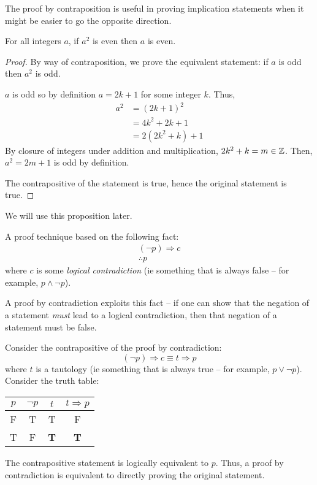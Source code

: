 \documentclass[main.tex]{subfiles}
\begin{document}
The proof by contraposition is useful in proving implication statements when it might be easier to go the opposite direction.

\begin{prop}\label{prop3.x:eucl-arg-lemma}
	For all integers \(a\), if \(a^2\) is even then \(a\) is even.
\end{prop}

\begin{proof}
	By way of contraposition, we prove the equivalent statement: if \(a\) is odd then \(a^2\) is odd.
	
	\(a\) is odd so by definition \(a = 2k+1\) for some integer \(k\). Thus,
	\begin{align*}
	a^2 &= (2k+1)^2 \\ &= 4k^2 + 2k + 1 \\ &= 2(2k^2 + k) + 1
	\end{align*}
	By closure of integers under addition and multiplication, \(2k^2 + k = m \in \mathbb{Z}\). Then, \(a^2 = 2m+1\) is odd by definition.
	
	The contrapositive of the statement is true, hence the original statement is true.
\end{proof}

We will use this proposition later. %


\begin{defn}
	A proof technique based on the following fact:
	\begin{align*}
	(\lnot p) \Rightarrow c \\
	\therefore p
	\end{align*}
	where \(c\) is some \textit{logical contradiction} (ie something that is always false -- for example, \(p \land \lnot p\)).
	
	A proof by contradiction exploits this fact -- if one can show that the negation of a statement \textit{must} lead to a logical contradiction, then that negation of a statement must be false.
\end{defn}

Consider the contrapositive of the proof by contradiction:
\[(\lnot p) \Rightarrow c \equiv t \Rightarrow p\]
where \(t\) is a tautology (ie something that is always true -- for example, \(p \lor \lnot p\)). Consider the truth table:
\begin{center}
	\begin{tabular}{cc|c|c}
		\(p\) & \(\lnot p\) & \(t\) & \(t \Rightarrow p\) \\
		\midrule
		F & T & T & F \\
		T & F & \textbf{T} & \textbf{T}
	\end{tabular}
\end{center}
The contrapositive statement is logically equivalent to \(p\). Thus, a proof by contradiction is equivalent to directly proving the original statement.
\end{document}
